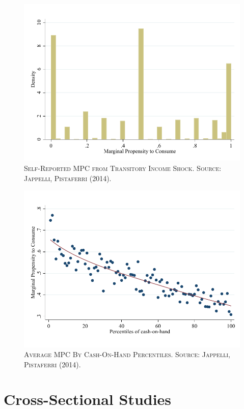 \documentclass[]{book}
\begin{document}
\begin{figure}

{\centering \includegraphics[width=0.8\linewidth,height=0.8\textheight]{figures/JappelliPistaferri2014/fig1} 

}

\caption{\textsc{Self-Reported MPC from Transitory
Income Shock. Source: Jappelli, Pistaferri (2014).}}\label{fig:jappelli-pistaferri-fig1}
\end{figure}




\begin{figure}

{\centering \includegraphics[width=0.8\linewidth,height=0.8\textheight]{figures/JappelliPistaferri2014/fig2} 

}

\caption{\textsc{Average MPC By Cash-On-Hand
Percentiles. Source: Jappelli, Pistaferri (2014).}}\label{fig:jappelli-pistaferri-fig2}
\end{figure}

\section{Cross-Sectional Studies}\label{cross-sectional-studies}
\end{document}
